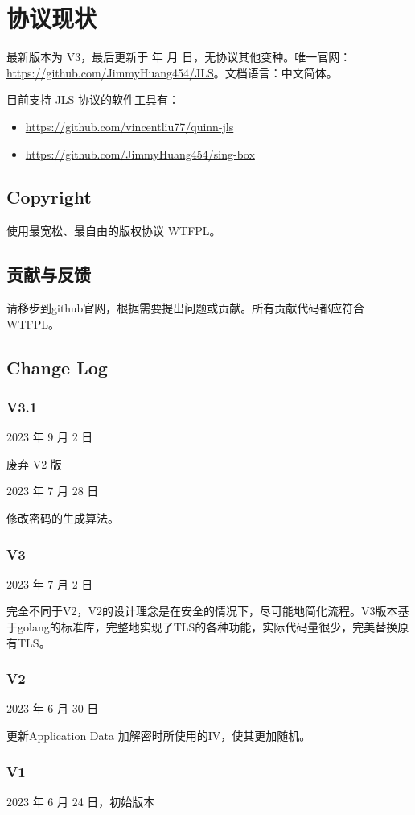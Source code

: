 \renewcommand{\today}{\number\year 年 \number\month 月 \number\day 日}

\chapter{协议现状}

最新版本为 V3，最后更新于 \today，无协议其他变种。唯一官网：\href{https://github.com/JimmyHuang454/JLS}{https://github.com/JimmyHuang454/JLS}。文档语言：中文简体。

目前支持 JLS 协议的软件工具有：
\begin{itemize}
	\item \href{vincentliu77/quinn-jls}{https://github.com/vincentliu77/quinn-jls}
	\item \href{JimmyHuang454/sing-box}{https://github.com/JimmyHuang454/sing-box}
\end{itemize}



\section{Copyright}
使用最宽松、最自由的版权协议 WTFPL。

\section{贡献与反馈}
请移步到github官网，根据需要提出问题或贡献。所有贡献代码都应符合 WTFPL。

\section{Change Log}
\subsection{V3.1}
2023 年 9 月 2 日

废弃 V2 版


2023 年 7 月 28 日

修改密码的生成算法。

\subsection{V3}
2023 年 7 月 2 日

完全不同于V2，V2的设计理念是在安全的情况下，尽可能地简化流程。V3版本基于golang的标准库，完整地实现了TLS的各种功能，实际代码量很少，完美替换原有TLS。

\subsection{V2}
2023 年 6 月 30 日

更新Application Data 加解密时所使用的IV，使其更加随机。


\subsection{V1}
2023 年 6 月 24 日，初始版本
